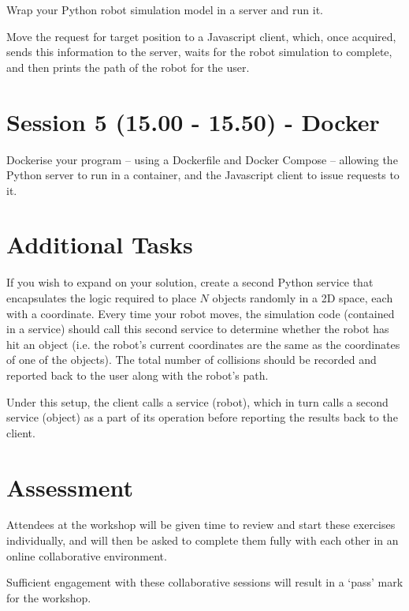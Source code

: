 \documentclass{article}
\begin{document}
Wrap your Python robot simulation model in a server and run it.

Move the request for target position to a Javascript client, which, once acquired, sends this information to the server, waits for the robot simulation to complete, and then prints the path of the robot for the user.

\section{Session 5 (15.00 - 15.50) - Docker}

Dockerise your program -- using a Dockerfile and Docker Compose -- allowing the Python server to run in a container, and the Javascript client to issue requests to it.

\section{Additional Tasks}

If you wish to expand on your solution, create a second Python service that encapsulates the logic required to place $N$ objects randomly in a 2D space, each with a coordinate. 
Every time your robot moves, the simulation code (contained in a service) should call this second service to determine whether the robot has hit an object (i.e. the robot's current coordinates are the same as the coordinates of one of the objects).
The total number of collisions should be recorded and reported back to the user along with the robot's path.

Under this setup, the client calls a service (robot), which in turn calls a second service (object) as a part of its operation before reporting the results back to the client.

\section{Assessment}

Attendees at the workshop will be given time to review and start these exercises individually, and will then be asked to complete them fully with each other in an online collaborative environment.

Sufficient engagement with these collaborative sessions will result in a `pass' mark for the workshop.
\end{document}
